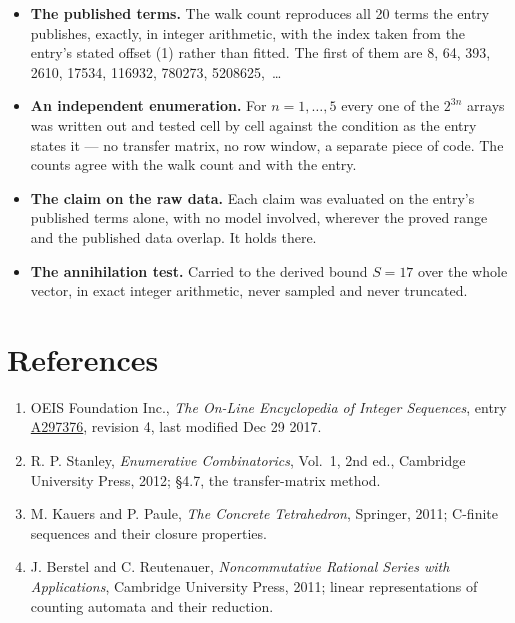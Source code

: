 \documentclass[11pt]{article}
\theoremstyle{definition}
\begin{document}
\begin{itemize}

\item {\bfseries The published terms.} The walk count reproduces all 20 terms the entry publishes, exactly, in integer arithmetic, with the index taken from the entry's stated offset (1) rather than fitted. The first of them are 8, 64, 393, 2610, 17534, 116932, 780273, 5208625,~\dots

\item {\bfseries An independent enumeration.} For $n = 1,\dots,5$ every one of the $2^{3n}$ arrays was written out and tested cell by cell against the condition as the entry states it --- no transfer matrix, no row window, a separate piece of code. The counts agree with the walk count and with the entry.

\item {\bfseries The claim on the raw data.} Each claim was evaluated on the entry's published terms alone, with no model involved, wherever the proved range and the published data overlap. It holds there.

\item {\bfseries The annihilation test.} Carried to the derived bound $S = 17$ over the whole vector, in exact integer arithmetic, never sampled and never truncated.

\end{itemize}

\section{References}

\begin{enumerate}

\item OEIS Foundation Inc., \emph{The On-Line Encyclopedia of Integer Sequences}, entry \href{https://oeis.org/A297376}{A297376}, revision 4, last modified Dec 29 2017.

\item R. P. Stanley, \emph{Enumerative Combinatorics}, Vol.~1, 2nd ed., Cambridge University Press, 2012; \S4.7, the transfer-matrix method.

\item M. Kauers and P. Paule, \emph{The Concrete Tetrahedron}, Springer, 2011; C-finite sequences and their closure properties.

\item J. Berstel and C. Reutenauer, \emph{Noncommutative Rational Series with Applications}, Cambridge University Press, 2011; linear representations of counting automata and their reduction.

\end{enumerate}
\end{document}
